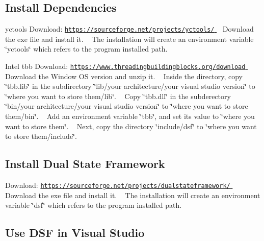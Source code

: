 \hypertarget{_installation_dependencies_win}{}\subsection{Install Dependencies}\label{_installation_dependencies_win}
\begin{DoxyParagraph}{yctools}
Download\+: \hyperlink{}{\href{https://sourceforge.net/projects/yctools/}{\tt https\+://sourceforge.\+net/projects/yctools/} } ~\newline
 Download the exe file and install it. ~\newline
 The installation will create an environment variable \char`\"{}yctools\char`\"{} which refers to the program installed path.
\end{DoxyParagraph}
\begin{DoxyParagraph}{Intel tbb}
Download\+: \hyperlink{}{\href{https://www.threadingbuildingblocks.org/download}{\tt https\+://www.\+threadingbuildingblocks.\+org/download} } ~\newline
 Download the Window O\+S version and unzip it. ~\newline
 Inside the directory, copy \char`\"{}tbb.\+lib\char`\"{} in the subdirectory \char`\"{}lib/your architecture/your visual studio version\char`\"{} to \char`\"{}where you want to store them/lib\char`\"{}. ~\newline
 Copy \char`\"{}tbb.\+dll\char`\"{} in the subderectory \char`\"{}bin/your architecture/your visual studio version\char`\"{} to \char`\"{}where you want to store them/bin\char`\"{}. ~\newline
 Add an environment variable \char`\"{}tbb\char`\"{}, and set its value to \char`\"{}where you want to store them\char`\"{}. ~\newline
 Next, copy the directory \char`\"{}include/dsf\char`\"{} to \char`\"{}where you want to store them/include\char`\"{}. 
\end{DoxyParagraph}
\hypertarget{_installation_dsf_win}{}\subsection{Install Dual State Framework}\label{_installation_dsf_win}
Download\+: \hyperlink{}{\href{https://sourceforge.net/projects/dualstateframework/}{\tt https\+://sourceforge.\+net/projects/dualstateframework/} } ~\newline
 Download the exe file and install it. ~\newline
 The installation will create an environment variable \char`\"{}dsf\char`\"{} which refers to the program installed path.\hypertarget{_installation_use_win}{}\subsection{Use D\+S\+F in Visual Studio}\label{_installation_use_win}

